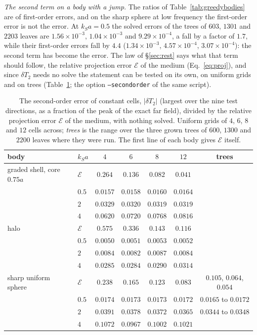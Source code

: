 \documentclass[11pt,a4paper]{article}
\newcommand{\cE}{\mathcal{E}}
\begin{document}
\emph{The second term on a body with a jump.} The ratios of Table~\ref{tab:greedybodies} are of
first-order errors, and on the sharp sphere at low frequency the first-order error is not the error. At
$k_Sa=0.5$ the solved errors of the trees of $603$, $1301$ and $2203$ leaves are $1.56\times10^{-3}$,
$1.04\times10^{-3}$ and $9.29\times10^{-4}$, a fall by a factor of $1.7$, while their first-order errors
fall by $4.4$ ($1.34\times10^{-3}$, $4.57\times10^{-4}$, $3.07\times10^{-4}$): the second term has become
the error. The law of \S\ref{sec:rest} says what that term should follow, the relative projection error
$\cE$ of the medium (Eq.~\eqref{eq:proj}), and since $\delta T_2$ needs no solve the statement can be
tested on its own, on uniform grids and on trees (Table~\ref{tab:secondenergy}; the option
\texttt{--secondorder} of the same script).
\begin{table}[htbp]
\centering
\caption{The second-order error of constant cells, $|\delta T_2|$ (largest over the nine test directions,
as a fraction of the peak of the exact far field), divided by the relative projection error $\cE$ of the
medium, with nothing solved. Uniform grids of $4$, $6$, $8$ and $12$ cells across; \emph{trees}
is the range over the three grown trees of $600$, $1300$ and $2200$ leaves where they were run. The first
line of each body gives $\cE$ itself.}\label{tab:secondenergy}
\small
\begin{tabular}{@{}llccccc@{}}
\toprule
body & $k_Sa$ & $4$ & $6$ & $8$ & $12$ & trees \\
\midrule
graded shell, core $0.75a$ & $\cE$ & $0.264$ & $0.136$ & $0.082$ & $0.041$ & \\
                           & $0.5$ & $0.0157$ & $0.0158$ & $0.0160$ & $0.0164$ & \\
                           & $2$   & $0.0329$ & $0.0320$ & $0.0319$ & $0.0319$ & \\
                           & $4$   & $0.0620$ & $0.0720$ & $0.0768$ & $0.0816$ & \\
\midrule
halo                       & $\cE$ & $0.575$ & $0.336$ & $0.143$ & $0.116$ & \\
                           & $0.5$ & $0.0050$ & $0.0051$ & $0.0053$ & $0.0052$ & \\
                           & $2$   & $0.0084$ & $0.0082$ & $0.0087$ & $0.0084$ & \\
                           & $4$   & $0.0285$ & $0.0284$ & $0.0290$ & $0.0314$ & \\
\midrule
sharp uniform sphere       & $\cE$ & $0.238$ & $0.165$ & $0.123$ & $0.083$ & $0.105$, $0.064$, $0.054$ \\
                           & $0.5$ & $0.0174$ & $0.0173$ & $0.0173$ & $0.0172$ & $0.0165$ to $0.0172$ \\
                           & $2$   & $0.0391$ & $0.0378$ & $0.0372$ & $0.0365$ & $0.0344$ to $0.0348$ \\
                           & $4$   & $0.1072$ & $0.0967$ & $0.1002$ & $0.1021$ & \\
\bottomrule
\end{tabular}
\end{table}
\end{document}
